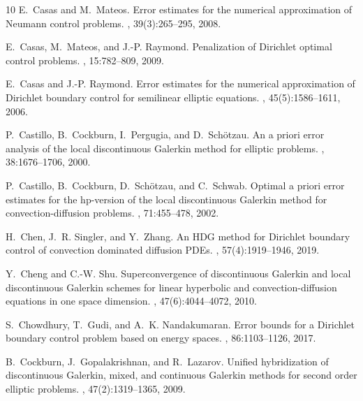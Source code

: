\documentclass[a4paper,10pt]{article}
\numberwithin{theorem}{section}
\begin{document}
\begin{thebibliography}{10}
E.~Casas and M.~Mateos.
\newblock Error estimates for the numerical approximation of {N}eumann control
  problems.
, 39(3):265--295, 2008.

E.~Casas, M.~Mateos, and J.-P. Raymond.
\newblock Penalization of {D}irichlet optimal control problems.
, 15:782--809, 2009.

E.~Casas and J.-P. Raymond.
\newblock Error estimates for the numerical approximation of {D}irichlet
  boundary control for semilinear elliptic equations.
, 45(5):1586--1611, 2006.

P.~Castillo, B.~Cockburn, I.~Pergugia, and D.~Sch{\"o}tzau.
\newblock An a priori error analysis of the local discontinuous {G}alerkin
  method for elliptic problems.
, 38:1676--1706, 2000.

P.~Castillo, B.~Cockburn, D.~Sch{\"o}tzau, and C.~Schwab.
\newblock Optimal a priori error estimates for the hp-version of the local
  discontinuous {G}alerkin method for convection-diffusion problems.
, 71:455--478, 2002.

H.~Chen, J.~R. Singler, and Y.~Zhang.
\newblock An {HDG} method for {Dirichlet} boundary control of convection
  dominated diffusion {PDEs}.
, 57(4):1919--1946, 2019.

Y.~Cheng and C.-W. Shu.
\newblock Superconvergence of discontinuous {G}alerkin and local discontinuous
  {G}alerkin schemes for linear hyperbolic and convection-diffusion equations
  in one space dimension.
, 47(6):4044--4072, 2010.

S.~Chowdhury, T.~Gudi, and A.~K. Nandakumaran.
\newblock Error bounds for a {D}irichlet boundary control problem based on
  energy spaces.
, 86:1103--1126, 2017.

B.~Cockburn, J.~Gopalakrishnan, and R.~Lazarov.
\newblock Unified hybridization of discontinuous {G}alerkin, mixed, and
  continuous {G}alerkin methods for second order elliptic problems.
, 47(2):1319--1365, 2009.


\end{thebibliography}
\end{document}
